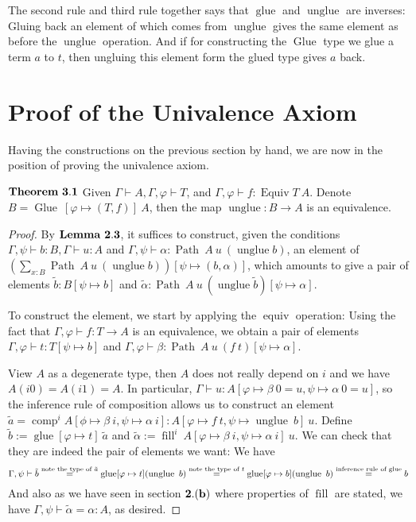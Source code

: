 \documentclass[11pt]{article}
\DeclareMathOperator{\Path}{Path}
\DeclareMathOperator{\Equiv}{Equiv}
\DeclareMathOperator{\unglue}{unglue}
\DeclareMathOperator{\Glue}{Glue}
\DeclareMathOperator{\comp}{comp}
\DeclareMathOperator{\filli}{fill}
\DeclareMathOperator{\glue}{glue}
\DeclareMathOperator{\equivi}{equiv}
\begin{document}
The second rule and third rule together says that $\glue$ and $\unglue$ are inverses: Gluing back an element of which comes from $\unglue$ gives the same element as before the $\unglue$ operation. And if for constructing the $\Glue$ type we glue a term $a$ to $t$, then ungluing this element form the glued type gives $a$ back.

\section{Proof of the Univalence Axiom}

Having the constructions on the previous section by hand, we are now in the position of proving the univalence axiom.

$\bf Theorem \ 3.1$ Given $\Gamma\vdash A,\Gamma,\varphi\vdash T$, and $\Gamma,\varphi\vdash f:\Equiv T \ A$. Denote $B= \Glue \ [\varphi\mapsto (T,f)] \ A$, then the map $\unglue:B\to A$ is an equivalence.

\begin{proof}
	By $\bf Lemma \ 2.3$, it suffices to construct, given the conditions $\Gamma,\psi\vdash b: B, \Gamma \vdash u : A$ and $\Gamma,\psi\vdash \alpha:\Path \ A \ u \ (\unglue b)$, an element of $(\sum_{x:B}\Path \ A \ u \ (\unglue b))[\psi \mapsto (b,\alpha)]$, which amounts to give a pair of elements $\tilde{b}:B[\psi\mapsto b]$ and $\tilde{\alpha}:\Path \ A \ u \ (\unglue \tilde{b})[\psi\mapsto \alpha]$.
	
	To construct the element, we start by applying the $\equivi$ operation: Using the fact that $\Gamma,\varphi\vdash f:T\to A$ is an equivalence, we obtain a pair of elements $\Gamma,\varphi\vdash t:T[\psi\mapsto b]$ and $\Gamma,\varphi\vdash \beta:\Path \ A \ u \ (f \ t)[\psi\mapsto\alpha]$. 
	
	View $A$ as a degenerate type, then $A$ does not really depend on $i$ and we have $A(i0)=A(i1)=A$. In particular, $\Gamma\vdash u:A[\varphi\mapsto \beta \ 0 = u,\psi\mapsto \alpha \ 0 = u]$, so the inference rule of composition allows us to construct an element $\tilde{a} = \comp^i A[\phi\mapsto \beta \ i,\psi\mapsto \alpha \ i]:A[\varphi\mapsto f \ t,\psi\mapsto \unglue \ b] \ u$. Define $\tilde{b}:= \glue [\varphi\mapsto t] \ \tilde{a}$ and $\tilde{\alpha} := \filli^i \ A [\varphi\mapsto \beta \ i,\psi\mapsto \alpha \ i] \ u$. We can check that they are indeed the pair of elements we want: We have 
	$$\Gamma,\psi\vdash \tilde{b}\overset{\text{note the type of $\tilde{a}$}}= \glue[\varphi\mapsto t](\unglue \ b)\\
	\overset{\text{note the type of $t$}}= \glue[\varphi\mapsto b](\unglue \ b)\\
		\overset{\text{inference rule of $\glue$}}= b
	$$
	And also as we have seen in section $\bf 2.(b)$ where properties of $\filli$ are stated, we have $\Gamma,\psi\vdash \tilde{\alpha} = \alpha:A$, as desired. 
	
\end{proof}
\end{document}
